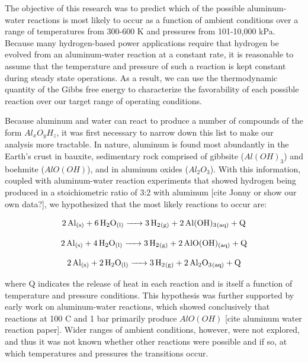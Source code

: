 \documentclass[preprint,12pt,3p]{elsarticle}
\begin{document}
The objective of this research was to predict which of the possible
aluminum-water reactions is most likely to occur as a function of ambient
conditions over a range of temperatures from 300-600 K and pressures from
101-10,000 kPa. Because many hydrogen-based power applications require that
hydrogen be evolved from an aluminum-water reaction at a constant rate, it is
reasonable to assume that the temperature and pressure of such a reaction is
kept constant during steady state operations. As a result, we can use the
thermodynamic quantity of the Gibbs free energy to characterize the favorability
of each possible reaction over our target range of operating conditions. 

Because aluminum and water can react to produce a number of compounds of the
form $Al_xO_yH_z$, it was first necessary to narrow down this list to make our
analysis more tractable. In nature, aluminum is found most abundantly in the
Earth's crust in bauxite, sedimentary rock comprised of gibbsite ($Al(OH)_3$)
and boehmite ($AlO(OH)$), and in aluminum oxides ($Al_2O_3$). With this
information, coupled with aluminum-water reaction experiments that showed
hydrogen being produced in a stoichiometric ratio of 3:2 with aluminum [cite
Jonny or show our own data?], we hypothesized that the most likely reactions to
occur are:  


\begin{equation}
  \ce{2Al_{(s)} + 6H2O_{(l)} -> 3H2_{(g)} + 2Al(OH)3_{(aq)} + Q}
  \label{eq:hydroxide}
\end{equation}

\begin{equation}
  \ce{2Al_{(s)} + 4H2O_{(l)} -> 3H2_{(g)} + 2AlO(OH)_{(aq)} + Q}
  \label{eq:oxyhydroxide}
\end{equation}

\begin{equation}
  \ce{2Al_{(s)} + 2H2O_{(l)} -> 3H2_{(g)} + 2Al2O3_{(aq)} + Q}
  \label{eq:oxide}
\end{equation}

\noindent where Q indicates the release of heat in each reaction and is itself a
function of temperature and pressure conditions. This hypothesis was further
supported by early work on aluminum-water reactions, which showed conclusively
that reactions at 100 \textdegree C and 1 bar primarily produce $AlO(OH)$ [cite
aluminum water reaction paper]. Wider ranges of ambient conditions, however,
were not explored, and thus it was not known whether other reactions were
possible and if so, at which temperatures and pressures the transitions occur.
\end{document}
